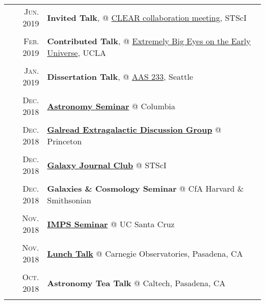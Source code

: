 \documentclass[letterpaper,10pt]{article}
\newcommand{\textwrap}{5.8in}       %
\begin{document}
\begin{longtable}{r|p{\textwrap}}
    \textsc{Jun. 2019}   &   \textbf{Invited Talk}, @ \href{https://sites.google.com/view/clearhst19/home}{CLEAR collaboration meeting}, STScI \\
    \multicolumn{2}{c}{} \\

    \textsc{Feb. 2019}   &   \textbf{Contributed Talk}, @ \href{https://conferences.pa.ucla.edu/early-universe-2019/agenda.html}{Extremely Big Eyes on the Early Universe}, UCLA  \\
    \multicolumn{2}{c}{} \\

    \textsc{Jan. 2019}   &   \textbf{Dissertation Talk}, @ \href{https://aas.org/meetings/aas233}{AAS 233}, Seattle    \\
    \multicolumn{2}{c}{} \\

    \textsc{Dec. 2018}   &   \href{http://www.astro.columbia.edu/event?eid=584}{\textbf{Astronomy Seminar}} @ Columbia \\
    \multicolumn{2}{c}{} \\

    \textsc{Dec. 2018}   &   \href{https://web.astro.princeton.edu/node/9886}{\textbf{Galread Extragalactic Discussion Group}} @ Princeton \\
    \multicolumn{2}{c}{} \\

    \textsc{Dec. 2018}   &   \href{https://sites.google.com/site/stscigalaxyclub/}{\textbf{Galaxy Journal Club}} @ STScI \\
    \multicolumn{2}{c}{} \\

    \textsc{Dec. 2018}   &   \textbf{Galaxies \& Cosmology Seminar} @ CfA Harvard \& Smithsonian \\
    \multicolumn{2}{c}{} \\

    \textsc{Nov. 2018}   &   \href{https://docs.google.com/document/d/1fhFuTsbHO7ATeQEiBvRQ4fj_BDR7pM4HPMjxeMyEyh4/edit}{\textbf{IMPS Seminar}} @ UC Santa Cruz \\
    \multicolumn{2}{c}{} \\

    \textsc{Nov. 2018}   &   \href{https://obs.carnegiescience.edu/content/tbd-108}{\textbf{Lunch Talk}} @ Carnegie Observatories, Pasadena, CA \\
    \multicolumn{2}{c}{} \\

    \textsc{Oct. 2018}   &   \textbf{Astronomy Tea Talk} @ Caltech, Pasadena, CA \\
    \multicolumn{2}{c}{} \\


\end{longtable}
\end{document}
